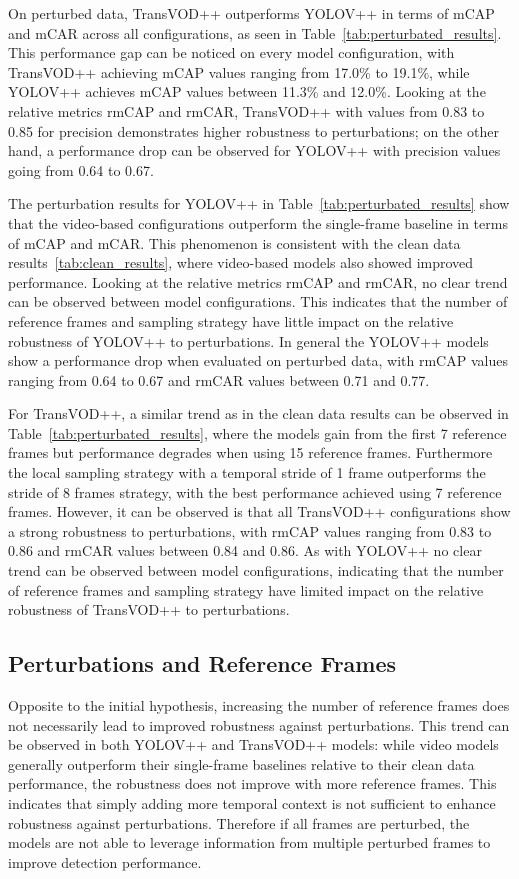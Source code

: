 \documentclass[final,twoside]{vutinfth}
\begin{document}
On perturbed data, TransVOD++ outperforms YOLOV++ in terms of mCAP and mCAR across all configurations, as seen in Table~\ref{tab:perturbated_results}.
This performance gap can be noticed on every model configuration, with TransVOD++ achieving mCAP values ranging from 17.0\% to 19.1\%, while YOLOV++ achieves mCAP values between 11.3\% and 12.0\%.
Looking at the relative metrics rmCAP and rmCAR, TransVOD++ with values from 0.83 to 0.85 for precision demonstrates higher robustness to perturbations; on the other hand, a performance drop can be observed for YOLOV++ with precision values going from 0.64 to 0.67.

The perturbation results for YOLOV++ in Table~\ref{tab:perturbated_results} show that the video-based configurations outperform the single-frame baseline in terms of mCAP and mCAR.\@
This phenomenon is consistent with the clean data results~\ref{tab:clean_results}, where video-based models also showed improved performance.
Looking at the relative metrics rmCAP and rmCAR, no clear trend can be observed between model configurations.
This indicates that the number of reference frames and sampling strategy have little impact on the relative robustness of YOLOV++ to perturbations.
In general the YOLOV++ models show a performance drop when evaluated on perturbed data, with rmCAP values ranging from 0.64 to 0.67 and rmCAR values between 0.71 and 0.77.

For TransVOD++, a similar trend as in the clean data results can be observed in Table~\ref{tab:perturbated_results}, where the models gain from the first 7 reference frames but performance degrades when using 15 reference frames.
Furthermore the local sampling strategy with a temporal stride of 1 frame outperforms the stride of 8 frames strategy, with the best performance achieved using 7 reference frames.
However, it can be observed is that all TransVOD++ configurations show a strong robustness to perturbations, with rmCAP values ranging from 0.83 to 0.86 and rmCAR values between 0.84 and 0.86.
As with YOLOV++ no clear trend can be observed between model configurations, indicating that the number of reference frames and sampling strategy have limited impact on the relative robustness of TransVOD++ to perturbations.

\subsection{Perturbations and Reference Frames}
Opposite to the initial hypothesis, increasing the number of reference frames does not necessarily lead to improved robustness against perturbations.
This trend can be observed in both YOLOV++ and TransVOD++ models: while video models generally outperform their single-frame baselines relative to their clean data performance, the robustness does not improve with more reference frames.
This indicates that simply adding more temporal context is not sufficient to enhance robustness against perturbations.
Therefore if all frames are perturbed, the models are not able to leverage information from multiple perturbed frames to improve detection performance.
\end{document}
